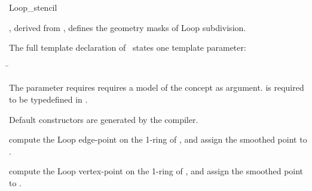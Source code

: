 \begin{ccRefClass}{Loop_stencil}

\ccDefinition

\ccClassTemplateName , derived from , 
defines the geometry masks of Loop subdivision. 


\ccParameters

The full template declaration of \ccClassTemplateName\ states one
template parameter:

\begin{tabbing}
 \= 
\end{tabbing}
   
The  parameter requires requires a model of 
the  concept as argument. 
 is required to be typedefined in .

\ccCreation

Default constructors are generated by the compiler.

\ccThree{}{}{}

{compute the Loop edge-point on the 1-ring of , 
and assign the smoothed point to .}

{compute the Loop vertex-point on the 1-ring of , 
and assign the smoothed point to .}


\ccSeeAlso

\\
\\

\end{ccRefClass}

\ccRefPageEnd


